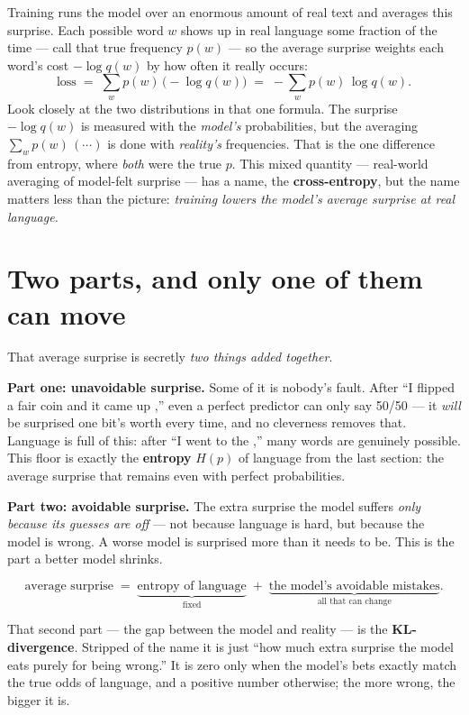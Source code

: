 \documentclass[11pt]{article}
\begin{document}
Training runs the model over an enormous amount of real text and averages this surprise. Each
possible word $w$ shows up in real language some fraction of the time --- call that true frequency
$p(w)$ --- so the average surprise weights each word's cost $-\log q(w)$ by how often it really
occurs:
\[
  \text{loss} \;=\; \sum_w p(w)\,\bigl(-\log q(w)\bigr) \;=\; -\sum_w p(w)\,\log q(w).
\]
Look closely at the two distributions in that one formula. The surprise $-\log q(w)$ is measured
with the \emph{model's} probabilities, but the averaging $\sum_w p(w)\,(\cdots)$ is done with
\emph{reality's} frequencies. That is the one difference from entropy, where \emph{both} were the
true $p$. This mixed quantity --- real-world averaging of model-felt surprise --- has a name, the
\textbf{cross-entropy}, but the name matters less than the picture: \emph{training lowers the
model's average surprise at real language.}

\section{Two parts, and only one of them can move}

That average surprise is secretly \emph{two things added together}.

\textbf{Part one: unavoidable surprise.} Some of it is nobody's fault. After ``I flipped a fair
coin and it came up \underline{\hspace{1.5em}},'' even a perfect predictor can only say 50/50 ---
it \emph{will} be surprised one bit's worth every time, and no cleverness removes that. Language
is full of this: after ``I went to the \underline{\hspace{1.5em}},'' many words are genuinely
possible. This floor is exactly the \textbf{entropy} $H(p)$ of language from the last section:
the average surprise that remains even with perfect probabilities.

\textbf{Part two: avoidable surprise.} The extra surprise the model suffers \emph{only because
its guesses are off} --- not because language is hard, but because the model is wrong. A worse
model is surprised more than it needs to be. This is the part a better model shrinks.

\[
  \text{average surprise} \;=\; \underbrace{\text{entropy of language}}_{\text{fixed}}
    \;+\; \underbrace{\text{the model's avoidable mistakes}}_{\text{all that can change}}.
\]

That second part --- the gap between the model and reality --- is the \textbf{KL-divergence}.
Stripped of the name it is just ``how much extra surprise the model eats purely for being
wrong.'' It is zero only when the model's bets exactly match the true odds of language, and a
positive number otherwise; the more wrong, the bigger it is.
\end{document}
